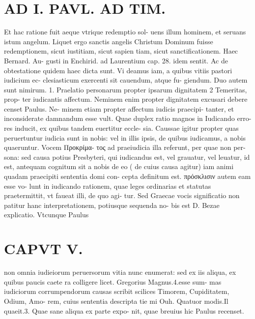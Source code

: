 \documentclass{article}
\begin{document}
\begin{pages}
\section*{AD I. PAVL. AD TIM. }
\marginpar{[ p.530 ]}\pstart Et hac ratione fuit aeque vtrique redemptio sol- uens illum hominem, et seruans istum angelum. Liquet ergo sanctis angelis Christum Dominum fuisse redemptionem, sicut iustitiam, sicut sapien tiam, sicut sanctificationem. Haec Bernard. Au- gusti in Enchirid. ad Laurentium cap. 28. idem sentit.  \pend\pstart Ac de obtestatione quidem haec dicta sunt. Vi deamus iam, a quibus vitiis pastori iudicium ec- clesiasticum exercenti sit cauendum, atque fu- giendum.  \pend\pstart Duo autem sunt nimirum. 1. Praelatio personarum propter ipsarum dignitatem 2 Temeritas, prop- ter iudicantis affectum. Neminem enim propter dignitatem excusari debere censet Paulus. Ne- minem etiam propter affectum iudicis praecipi- tanter, et inconsiderate damnandum esse vult. Quae duplex ratio magnos in Iudicando erro- res inducit, ex quibus tandem euertitur eccle- sia. Caussae igitur propter quas peruertuntur iudicia sunt in nobis: vel in illis ipsis, de quibus iudicamus, a nobis quaeruntur. Vocem Προκρίμα- τος ad praeiudicia illa referunt, per quae non per- sona: sed causa potius Presbyteri, qui iudicandus est, vel grauatur, vel leuatur, id est, antequam cognitum sit a nobis de eo ( de cuius causa agitur) iam animi quadam praecipiti sententia domi con- cepta definitum est. πρόσκλισιν autem eam esse vo- lunt in iudicando rationem, quae leges ordinarias et statutas praetermittit, vt faueat illi, de quo agi- tur. Sed Graecae vocis significatio non patitur hanc interpretationem, potiusque sequenda no- bis est D. Bezae explicatio. Vtcunque Paulus  \pend
\section*{CAPVT  V. }
\marginpar{[ p.337 ]}\pstart non omnia iudieiorum peruersorum vitia nunc enumerat: sed ex iis aliqua, ex quibus paucis caete ra colligere licet. Gregorius Magnus.4.esse sum- mas iudiciorum corrumpendorum causas scribit scilices Timorem, Cupiditatem, Odium, Amo- rem, cuius sententia descripta tie mi Ouh. Quatuor modis.Il quaeit.3. Quae sane aliqua ex parte expo- nit, quae breuius hic Paulus recenset.  \pend
{}
{}

\end{pages}
\end{document}
